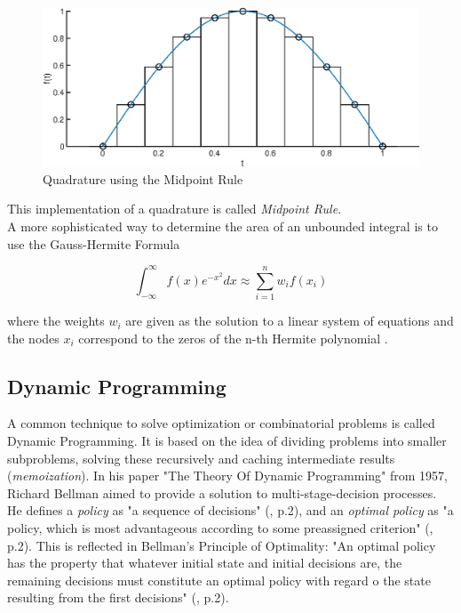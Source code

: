 \documentclass[12pt, a4paper, oneside]{article}
\begin{document}
	\begin{figure}[ht] 
		\includegraphics[width=1\textwidth]{figures/quadratureA.eps}
		\caption{Quadrature using the Midpoint Rule}
		\label{fig:quadrature-a}
	\end{figure}
This implementation of a quadrature is called \emph{Midpoint Rule}. 
\\

A more sophisticated way to determine the area of an unbounded integral is to use the Gauss-Hermite Formula

	\begin{equation}
	\int_{-\infty}^{\infty} f(x)e^{-x^2} dx \approx \sum_{i=1}^{n}{w_if(x_i)}
	\end{equation}

where the weights $w_i$ are given as the solution to a linear system of equations and the nodes $x_i$ correspond to the zeros of the n-th Hermite polynomial \citep{seminar:week6}.

\subsection{Dynamic Programming}

A common technique to solve optimization or combinatorial problems is called Dynamic Programming. 
It is based on the idea of dividing problems into smaller subproblems, solving these recursively and caching intermediate results (\textit{memoization}). 
In his paper "The Theory Of Dynamic Programming" from 1957, Richard Bellman aimed to provide a solution to multi-stage-decision processes. 
He defines a \textit{policy} as "a sequence of decisions" (\cite{bellman:1957}, p.2), and an \textit{optimal policy} as "a policy, which is most advantageous according to some preassigned criterion" (\cite{bellman:1957}, p.2). 
This is reflected in Bellman's Principle of Optimality: "An optimal policy has the property that whatever initial state and initial decisions are, the remaining decisions must constitute an optimal policy with regard o the state resulting from the first decisions" (\cite{bellman:1957}, p.2). 
\end{document}
